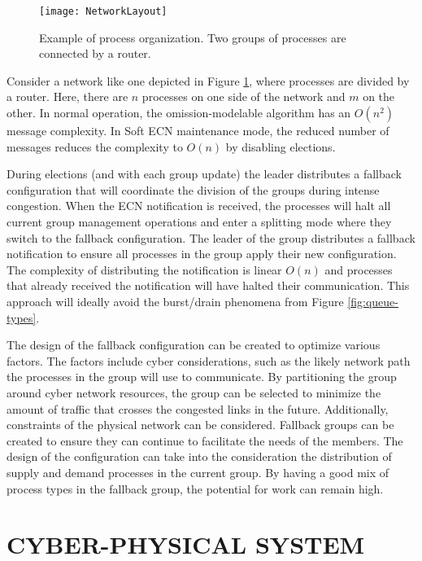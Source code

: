 \begin{figure}
\centering
\texttt{[image: NetworkLayout]}
\caption[Example of process organization]{Example of process organization. Two groups of processes are connected by a router.} \label{fig:network-layout}
\end{figure}

Consider a network like one depicted in Figure \ref{fig:network-layout}, where processes are divided by a router.
Here, there are $n$ processes on one side of the network and $m$ on the other.
In normal operation, the omission-modelable algorithm has an $O(n^2)$ message complexity.
In Soft \ac{ECN} maintenance mode, the reduced number of messages reduces the complexity to $O(n)$ by disabling elections.

During elections (and with each group update) the leader distributes a fallback configuration that will coordinate the division of the groups during intense congestion.
When the \ac{ECN} notification is received, the processes will halt all current group management operations and enter a splitting mode where they switch to the fallback configuration.
The leader of the group distributes a fallback notification to ensure all processes in the group apply their new configuration. 
The complexity of distributing the notification is linear $O(n)$ and processes that already received the notification will have halted their communication.
This approach will ideally avoid the burst/drain phenomena from Figure \ref{fig:queue-types}.

The design of the fallback configuration can be created to optimize various factors.
The factors include cyber considerations, such as the likely network path the processes in the group will use to communicate.
By partitioning the group around cyber network resources, the group can be selected to minimize the amount of traffic that crosses the congested links in the future.
Additionally, constraints of the physical network can be considered.
Fallback groups can be created to ensure they can continue to facilitate the needs of the members.
The design of the configuration can take into the consideration the distribution of supply and demand processes in the current group.
By having a good mix of process types in the fallback group, the potential for work can remain high.

\section{CYBER-PHYSICAL SYSTEM}

